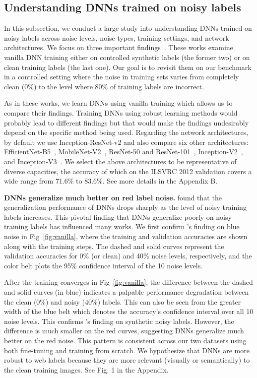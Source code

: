 \documentclass{article}
\begin{document}
\subsection{Understanding DNNs trained on noisy labels} \label{sec:exp_understanding}
In this subsection, we conduct a large study into understanding DNNs trained on noisy labels across noise levels, noise types, training settings, and network architectures. We focus on three important findings~\citep{zhang2017understanding,arpit2017closer,kornblith2019better}. These works examine vanilla DNN training either on controlled synthetic labels (the former two) or on clean training labels (the last one). Our goal is to revisit them on our benchmark in a controlled setting where the noise in training sets varies from completely clean (0\%) to the level where 80\% of training labels are incorrect. 

As in these works, we learn DNNs using vanilla training which allows us to compare their findings. Training DNNs using robust learning methods would probably lead to different findings but that would make the findings undesirably depend on the specific method being used. Regarding the network architectures, by default we use Inception-ResNet-v2 and also compare six other architectures: EfficientNet-B5~\citep{tan2019efficientnet}, MobileNet-V2~\citep{sandler2018mobilenetv2}, ResNet-50 and ResNet-101~\citep{he2016deep}, Inception-V2~\citep{ioffe2015batch}, and Inception-V3~\citep{szegedy2016rethinking}. We select the above architectures to be representative of diverse capacities, the accuracy of which on the ILSVRC 2012 validation covers a wide range from 71.6\% to 83.6\%. See more details in the Appendix B.




{\bf DNNs generalize much better on red label noise.} \citet{zhang2017understanding} found that the generalization performance of DNNs drops sharply as the level of noisy training labels increases. This pivotal finding that DNNs generalize poorly on noisy training labels has influenced many works. We first confirm \citet{zhang2017understanding}'s finding on blue noise in Fig~\ref{fig:vanilla}, where the training and validation accuracies are shown along with the training steps. The dashed and solid curves represent the validation accuracies for 0\% (or clean) and 40\% noise levels, respectively, and the color belt plots the 95\% confidence interval of the 10 noise levels.

After the training converges in Fig~\ref{fig:vanilla}, the difference between the dashed and solid curves (in blue) indicates a palpable performance degradation between the clean (0\%) and noisy (40\%) labels. This can also be seen from the greater width of the blue belt which denotes the accuracy's confidence interval over all 10 noise levels. This confirms \citet{zhang2017understanding}'s finding on synthetic noisy labels. However, the difference is much smaller on the red curves, suggesting DNNs generalize much better on the red noise. This pattern is consistent across our two datasets using both fine-tuning and training from scratch. We hypothesize that DNNs are more robust to web labels because they are more relevant (visually or semantically) to the clean training images. See Fig. 1 in the Appendix.
\end{document}
